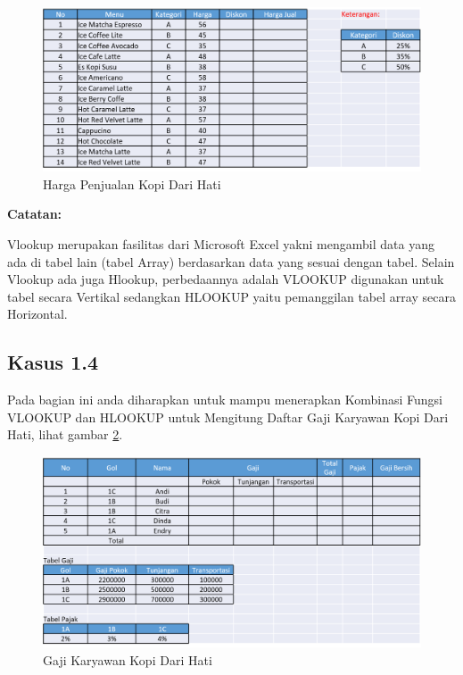 \documentclass[
]{book}
\begin{document}
\begin{figure}

{\centering \includegraphics[width=1\linewidth]{images/tabel3} 

}

\caption{Harga Penjualan Kopi Dari Hati}\label{fig:tabel3}
\end{figure}

\textbf{Catatan:}

Vlookup merupakan fasilitas dari Microsoft Excel yakni mengambil data yang ada di tabel lain (tabel Array) berdasarkan data yang sesuai dengan tabel. Selain Vlookup ada juga Hlookup, perbedaannya adalah VLOOKUP digunakan untuk tabel secara Vertikal sedangkan HLOOKUP yaitu pemanggilan tabel array secara Horizontal.

\hypertarget{kasus-1.4}{%
\subsection*{Kasus 1.4}\label{kasus-1.4}}

Pada bagian ini anda diharapkan untuk mampu menerapkan Kombinasi Fungsi VLOOKUP dan HLOOKUP untuk Mengitung Daftar Gaji Karyawan Kopi Dari Hati, lihat gambar \ref{fig:tabel4}.

\begin{figure}

{\centering \includegraphics[width=1\linewidth]{images/tabel4} 

}

\caption{Gaji Karyawan Kopi Dari Hati}\label{fig:tabel4}
\end{figure}
\end{document}
